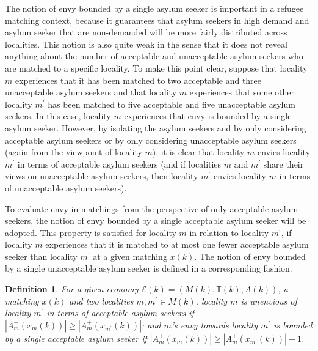 \documentclass[12pt,fleqn]{article}
\newtheorem{definition}{Definition}
\begin{document}
\noindent The notion of envy bounded by a single asylum seeker is important in a refugee matching context, because it guarantees that asylum seekers in high demand and asylum seeker that are non-demanded will be more fairly distributed across localities. This notion is also quite weak in the sense that it does not reveal anything about the number of acceptable and unacceptable asylum seekers who are matched to a specific locality. To make this point clear, suppose that locality $m$ experiences that it has been matched to two acceptable and three unacceptable asylum seekers and that locality $m$ experiences that some other locality $m^\prime$ has been matched to five acceptable and five unacceptable asylum seekers. In this case, locality $m$ experiences that envy is bounded by a single asylum seeker. However, by isolating the asylum seekers and by only considering acceptable asylum seekers or by only considering unacceptable asylum seekers (again from the viewpoint of locality $m$), it is clear that locality $m$ envies locality $m^\prime$ in terms of acceptable asylum seekers (and if localities $m$ and $m^\prime$ share their views on unacceptable asylum seekers, then locality $m^\prime$ envies locality $m$ in terms of unacceptable asylum seekers).

To evaluate envy in matchings from the perspective of only acceptable asylum seekers, the notion of envy bounded by a single acceptable asylum seeker will be adopted. This property is satisfied for locality $m$ in relation to locality $m^\prime$, if locality $m$ experiences that it is matched to at most one fewer acceptable asylum seeker than locality $m^\prime$ at a given matching $x(k)$. The notion of envy bounded by a single unacceptable asylum seeker is defined in a corresponding fashion.

\begin{definition}\rm\label{DEF:1-Envy_ACC}
For a given economy $\mathcal{E}(k)=(M(k),\mathbb{T}(k),A(k))$, a matching $x(k)$ and two localities $m,m^\prime\in M(k)$, locality $m$ is unenvious of locality $m^\prime$ in terms of acceptable asylum seekers if $|A_m^+(x_m(k))|\geq |A_m^+(x_{m^\prime}(k))|$; and $m$'s envy towards locality $m^\prime$ is bounded by a single acceptable asylum seeker if $|A_m^+(x_m(k))|\geq |A_m^+(x_{m^\prime}(k))|-1$.
\end{definition}
\end{document}
